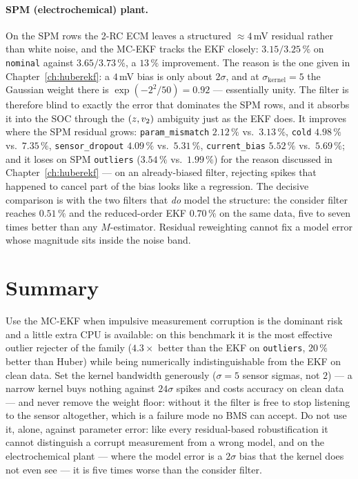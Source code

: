 \paragraph{SPM (electrochemical) plant.}  On the SPM rows the 2-RC ECM leaves a structured
$\approx4$\,mV residual rather than white noise, and the MC-EKF tracks the EKF closely:
$3.15/3.25\,\%$ on \texttt{nominal} against $3.65/3.73\,\%$, a $13\,\%$ improvement.  The reason is
the one given in Chapter~\ref{ch:huberekf}: a $4$\,mV bias is only about $2\sigma$, and at
$\sigma_{\mathrm{kernel}}=5$ the Gaussian weight there is $\exp(-2^2/50)=0.92$ --- essentially
unity.  The filter is therefore blind to exactly the error that dominates the SPM rows, and it
absorbs it into the SOC through the $(z,v_2)$ ambiguity just as the EKF does.  It improves where
the SPM residual grows: \texttt{param\_mismatch} $2.12\,\%$ vs.\ $3.13\,\%$, \texttt{cold}
$4.98\,\%$ vs.\ $7.35\,\%$, \texttt{sensor\_dropout} $4.09\,\%$ vs.\ $5.31\,\%$,
\texttt{current\_bias} $5.52\,\%$ vs.\ $5.69\,\%$; and it loses on SPM \texttt{outliers}
($3.54\,\%$ vs.\ $1.99\,\%$) for the reason discussed in Chapter~\ref{ch:huberekf} --- on an
already-biased filter, rejecting spikes that happened to cancel part of the bias looks like a
regression.  The decisive comparison is with the two filters that \emph{do} model the structure:
the consider filter reaches $0.51\,\%$ and the reduced-order EKF $0.70\,\%$ on the same data, five
to seven times better than any $M$-estimator.  Residual reweighting cannot fix a model error whose
magnitude sits inside the noise band.


\section{Summary}
Use the MC-EKF when impulsive measurement corruption is the dominant risk and a little extra CPU
is available: on this benchmark it is the most effective outlier rejecter of the family
($4.3\times$ better than the EKF on \texttt{outliers}, $20\,\%$ better than Huber) while being
numerically indistinguishable from the EKF on clean data.  Set the kernel bandwidth generously
($\sigma=5$ sensor sigmas, not $2$) --- a narrow kernel buys nothing against $24\sigma$ spikes and
costs accuracy on clean data --- and never remove the weight floor: without it the filter is free
to stop listening to the sensor altogether, which is a failure mode no BMS can accept.  Do not use
it, alone, against parameter error: like every residual-based robustification it cannot distinguish
a corrupt measurement from a wrong model, and on the electrochemical plant --- where the model
error is a $2\sigma$ bias that the kernel does not even see --- it is five times worse than the
consider filter.
